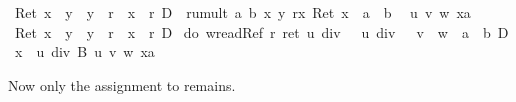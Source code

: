 \begin{isabellebody}
\begin{isamarkuptxt}
      \begin{isabelle}%
{\isasymturnstile}\ Ret\ {\isacharparenleft}x\ {\isasymnoteq}\ y\ {\isasymand}\ y\ {\isasymnoteq}\ r\ {\isasymand}\ x\ {\isasymnoteq}\ r{\isacharparenright}\ {\isasymlongrightarrow}\isactrlsub D\ {\isacharbrackleft}{\isacharhash}\ rumult\ a\ b\ x\ y\ r{\isacharbrackright}{\isacharparenleft}{\isasymlambda}x{\isachardot}\ Ret\ {\isacharparenleft}x\ {\isacharequal}\ a\ {\isacharasterisk}\ b{\isacharparenright}{\isacharparenright}\isanewline
\ {}{\isachardot}\ {\isasymAnd}u\ v\ w\ xa{\isachardot}\isanewline
{}\ Ret\ {\isacharparenleft}x\ {\isasymnoteq}\ y\ {\isasymand}\ y\ {\isasymnoteq}\ r\ {\isasymand}\ x\ {\isasymnoteq}\ r{\isacharparenright}\ {\isasymand}\isactrlsub D\isanewline
{}\ {\isacharparenleft}do\ {\isacharbraceleft}w{\isasymleftarrow}readRef\ r{\isacharsemicolon}\ ret\ {\isacharparenleft}{\isacharparenleft}u\ div\ {}\ {\isacharplus}\ u\ div\ {}{\isacharparenright}\ {\isacharasterisk}\ v\ {\isacharplus}\ w\ {\isacharequal}\ a\ {\isacharasterisk}\ b{\isacharparenright}{\isacharbraceright}{\isacharparenright}\ {\isasymlongrightarrow}\isactrlsub D\isanewline
{}\ x\ {\isacharcolon}{\isacharequal}\ u\ div\ {}{\isacharbrackright}{\isacharquery}B{}{}{}\ u\ v\ w\ xa%
\end{isabelle}%
\end{isamarkuptxt}%
\isamarkuptrue%
\isamarkupfalse%
\isamarkupfalse%
\isamarkupfalse%
\isamarkupfalse%
\isamarkupfalse%
\isamarkupfalse%
\isamarkupfalse%
%
\begin{isamarkuptxt}%
Now only the assignment to  remains.


\end{isamarkuptxt}
\end{isabellebody}
